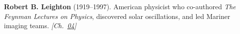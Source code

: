\textbf{Robert B. Leighton} (1919–1997). American physicist who co-authored \emph{The Feynman Lectures on Physics}, discovered solar oscillations, and led Mariner imaging teams. \emph{[Ch.~\hyperref[ch:energytransmission]{04}]}

